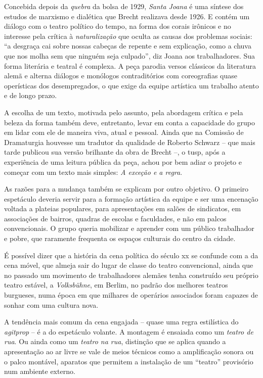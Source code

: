 Concebida depois da {\it quebra} da bolsa de 1929, {\it Santa Joana} é
uma síntese dos estudos de marxismo e dialética que Brecht realizava
desde 1926. E contém um diálogo com o teatro político do tempo, na forma
dos corais irônicos e no interesse pela crítica à {\it naturalização}
que oculta as causas dos problemas sociais: “a desgraça cai sobre nossas
cabeças de repente e sem explicação, como a chuva que nos molha sem que
ninguém seja culpado”, diz Joana aos trabalhadores. Sua forma literária
e teatral é complexa. A peça parodia versos clássicos da literatura
alemã e alterna diálogos e monólogos contraditórios com coreografias
quase operísticas dos desempregados, o que exige da equipe artística um
trabalho atento e de longo prazo.

A escolha de um texto, motivada pelo assunto, pela abordagem crítica e
pela beleza da forma também deve, entretanto, levar em conta a
capacidade do grupo em lidar com ele de maneira viva, atual e pessoal.
Ainda que na Comissão de Dramaturgia houvesse um tradutor da qualidade
de Roberto Schwarz -- que mais tarde publicou sua versão brilhante da
obra de Brecht --, o {\sc tusp}, após a experiência de uma leitura pública da
peça, achou por bem adiar o projeto e começar com um texto mais simples:
{\it A exceção e a regra}.

As razões para a mudança também se explicam por outro objetivo. O
primeiro espetáculo deveria servir para a formação artística da equipe e
ser uma encenação voltada a plateias populares, para apresentações em
salões de sindicatos, em associações de bairros, quadras de escolas e
faculdades, e não em palcos convencionais. O grupo queria mobilizar e
aprender com um público trabalhador e pobre, que raramente frequenta os
espaços culturais do centro da cidade.

\subject{Modelos de teatralidade: a cena volante}

É possível dizer que a história da cena política do século {\sc xx} se
confunde com a da cena móvel, que almeja sair do lugar de classe do
teatro convencional, ainda que no passado um movimento de trabalhadores
alemães tenha construído seu próprio teatro estável, a {\it Volksbühne},
em Berlim, no padrão dos melhores teatros burgueses, numa época em que
milhares de operários associados foram capazes de sonhar com uma cultura
nova.

A tendência mais comum da cena engajada -- quase uma regra estilística do
{\it agitprop} -- é a do espetáculo volante. A montagem é ensaiada como
um {\it teatro de rua}. Ou ainda como um {\it teatro na rua}, distinção
que se aplica quando a apresentação ao ar livre se vale de meios
técnicos como a amplificação sonora ou o palco montável, aparatos que
permitem a instalação de um “teatro” provisório num ambiente externo.


